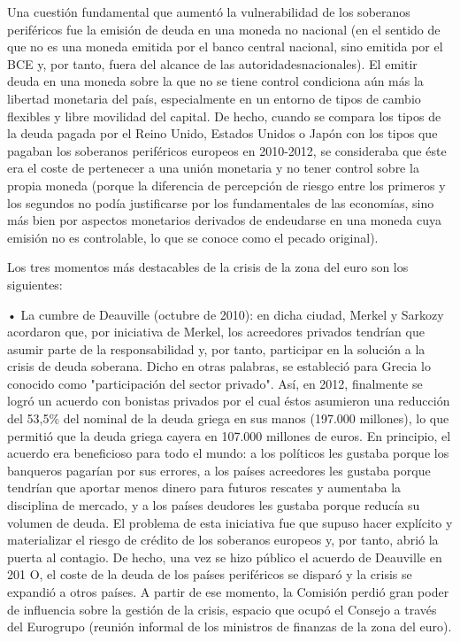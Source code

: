 \documentclass[10pt,a4paper]{article}
\begin{document}
Una cuestión fundamental que aumentó la vulnerabilidad de los soberanos periféricos fue la emisión de deuda en una moneda no nacional (en el sentido de que no es una moneda emitida por el banco central nacional, sino emitida por el BCE y, por tanto, fuera del alcance de las autoridadesnacionales). El emitir deuda en una moneda sobre la que no se tiene control condiciona aún más la libertad monetaria del país, especialmente en un entorno de tipos de cambio flexibles y libre movilidad del capital. De hecho, cuando se compara los tipos de la deuda pagada por el Reino Unido, Estados Unidos o Japón con los tipos que pagaban los soberanos periféricos europeos en 2010-2012, se consideraba que éste era el coste de pertenecer a una unión monetaria y no tener control sobre la propia moneda (porque la diferencia de percepción de riesgo entre los primeros y los segundos no podía justificarse por los fundamentales de las economías, sino más bien por aspectos monetarios derivados de endeudarse en una moneda cuya emisión no es controlable, lo que se conoce como el pecado original). 

Los tres momentos más destacables de la crisis de la zona del euro son los siguientes:

• La cumbre de Deauville (octubre de 2010): en dicha ciudad, Merkel y Sarkozy acordaron que, por iniciativa de Merkel, los acreedores privados tendrían que asumir parte de la responsabilidad y, por tanto, participar en la solución a la crisis de deuda soberana. Dicho en otras palabras, se estableció para Grecia lo conocido como "participación del sector privado". Así, en 2012, finalmente se logró un acuerdo con bonistas privados por el cual éstos asumieron una reducción del 53,5\% del nominal de la deuda griega en sus manos (197.000 millones), lo que permitió que la deuda griega cayera en 107.000 millones de euros. En principio, el acuerdo era beneficioso para todo el mundo: a los políticos les gustaba porque los banqueros pagarían por sus errores, a los países acreedores les gustaba porque tendrían que aportar menos dinero para futuros rescates y aumentaba la disciplina de mercado, y a los países deudores les gustaba porque reducía su volumen de deuda. El problema de esta iniciativa fue que supuso hacer explícito y materializar el riesgo de crédito de los soberanos europeos y, por tanto, abrió la puerta al contagio. De hecho, una vez se hizo público el acuerdo de Deauville en 201 O, el coste de la deuda de los países periféricos se disparó y la crisis se expandió a otros países. A partir de ese momento, la Comisión perdió gran poder de influencia sobre la gestión de la crisis, espacio que ocupó el Consejo a través del Eurogrupo (reunión informal de los ministros de finanzas de la zona del euro).
\end{document}
